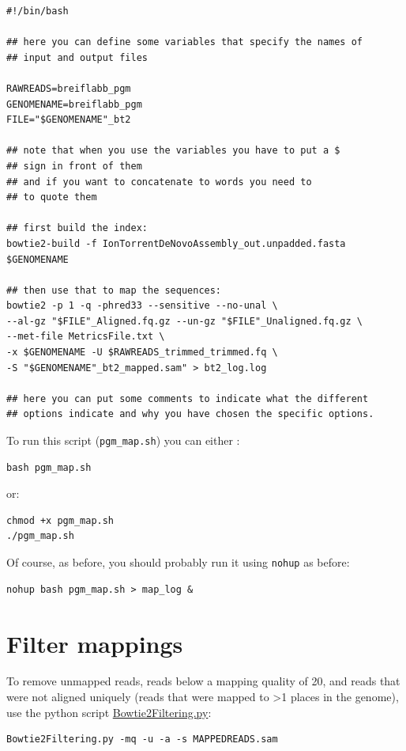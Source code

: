 \documentclass[11pt]{article}
\begin{document}
\begin{verbatim}
#!/bin/bash

## here you can define some variables that specify the names of
## input and output files

RAWREADS=breiflabb_pgm
GENOMENAME=breiflabb_pgm
FILE="$GENOMENAME"_bt2

## note that when you use the variables you have to put a $
## sign in front of them
## and if you want to concatenate to words you need to
## to quote them

## first build the index:
bowtie2-build -f IonTorrentDeNovoAssembly_out.unpadded.fasta $GENOMENAME

## then use that to map the sequences:
bowtie2 -p 1 -q -phred33 --sensitive --no-unal \
--al-gz "$FILE"_Aligned.fq.gz --un-gz "$FILE"_Unaligned.fq.gz \
--met-file MetricsFile.txt \
-x $GENOMENAME -U $RAWREADS_trimmed_trimmed.fq \
-S "$GENOMENAME"_bt2_mapped.sam" > bt2_log.log

## here you can put some comments to indicate what the different
## options indicate and why you have chosen the specific options.
\end{verbatim}

To run this script (\texttt{pgm\_map.sh}) you can either :


\begin{verbatim}
bash pgm_map.sh
\end{verbatim}

or:


\begin{verbatim}
chmod +x pgm_map.sh
./pgm_map.sh
\end{verbatim}

Of course, as before, you should probably run it using \texttt{nohup} as before:


\begin{verbatim}
nohup bash pgm_map.sh > map_log &
\end{verbatim}
\section{Filter mappings}
\label{sec-2}

To remove unmapped reads, reads below a mapping quality of 20, and
reads that were not aligned uniquely (reads that were mapped to >1
places in the genome), use the python script \href{http://marinetics.org/2015/03/03/Bowtie2Filtering.html}{Bowtie2Filtering.py}:


\begin{verbatim}
Bowtie2Filtering.py -mq -u -a -s MAPPEDREADS.sam
\end{verbatim}
\end{document}
